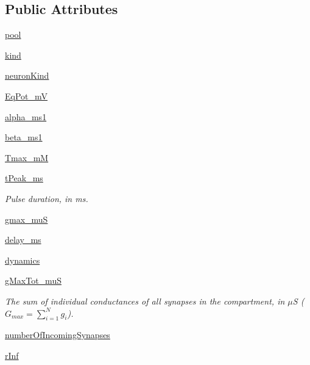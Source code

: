 \subsection*{Public Attributes}
\begin{DoxyCompactItemize}
\item 
\hyperlink{class_synapse_1_1_synapse_a133990bf3ab7f1efa8b416be73d07a11}{pool}
\item 
\hyperlink{class_synapse_1_1_synapse_aa2ea45450a3ad13cfefcae9fabe6ce15}{kind}
\item 
\hyperlink{class_synapse_1_1_synapse_a031af2fe7be76f9b5f69c087228a1b9a}{neuron\-Kind}
\item 
\hyperlink{class_synapse_1_1_synapse_adc80e9a62c17b29a92c2e7a0413e572d}{Eq\-Pot\-\_\-m\-V}
\item 
\hyperlink{class_synapse_1_1_synapse_ae15502cd5d5604d38328b2b1432477d7}{alpha\-\_\-ms1}
\item 
\hyperlink{class_synapse_1_1_synapse_ab59f413cbd21555531be209dee307a97}{beta\-\_\-ms1}
\item 
\hyperlink{class_synapse_1_1_synapse_ae4bcd698c5be77c2a6629d511d75f046}{Tmax\-\_\-m\-M}
\item 
\hyperlink{class_synapse_1_1_synapse_a09b9b092efcb0d6745fa32fadcd46375}{t\-Peak\-\_\-ms}
\begin{DoxyCompactList}\small\item\em Pulse duration, in ms. \end{DoxyCompactList}\item 
\hyperlink{class_synapse_1_1_synapse_a7922dac4765183cb6052905cc0d251cb}{gmax\-\_\-mu\-S}
\item 
\hyperlink{class_synapse_1_1_synapse_a14adfda48133bd314f4dcd65fc9a2366}{delay\-\_\-ms}
\item 
\hyperlink{class_synapse_1_1_synapse_a67a1454de1ef2f08ffa3a10bf8466158}{dynamics}
\item 
\hyperlink{class_synapse_1_1_synapse_a470750725ecb176e048a973b9dc23ea3}{g\-Max\-Tot\-\_\-mu\-S}
\begin{DoxyCompactList}\small\item\em The sum of individual conductances of all synapses in the compartment, in $\mu$S ( $G_{max} = \limits\sum_{i=1}^Ng_i$). \end{DoxyCompactList}\item 
\hyperlink{class_synapse_1_1_synapse_a6e55e008336cc47551669f3d77248d57}{number\-Of\-Incoming\-Synapses}
\item 
\hyperlink{class_synapse_1_1_synapse_afd263d49a97910efd8955a2aadef50e0}{r\-Inf}

\end{DoxyCompactItemize}
